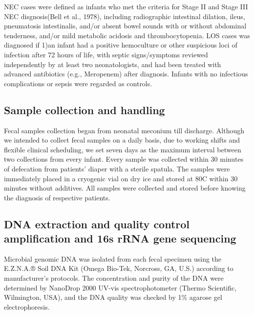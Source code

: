 \documentclass[fleqn,10pt,lineno]{wlpeerj} %
\begin{document}
  NEC cases were defined as infants who met the criteria for Stage II and Stage III NEC disgnosis(Bell et al., 1978), including radiographic intestinal dilation, ileus, pneumatosis intestinalis, and/or absent bowel sounds with or without abdominal tenderness, and/or mild metabolic acidosis and thrombocytopenia. LOS cases was diagnosed if 1)an infant had a positive hemoculture or other suspicious loci of infection after 72 hours of life, with septic signs/symptoms reviewed independently by at least two neonatologists, and had been treated with advanced antibiotics (e.g., Meropenem) after diagnosis. Infants with no infectious complications or sepsis were regarded as controls.

  \subsection*{Sample collection and handling}
  Fecal samples collection began from neonatal meconium till discharge.   Although we intended to collect fecal samples on a daily basis, due to working shifts and flexible clinical scheduling, we set seven days as the maximum interval between two collections from every infant. Every sample was collected within 30 minutes of defecation from patients' diaper with a sterile spatula. The samples were immediately placed in a cryogenic vial on dry ice and stored at 80\textdegree{}C within 30 minutes without additives. All samples were collected and stored before knowing the diagnosis of respective patients.

  \subsection*{DNA extraction and quality control amplification and 16s rRNA gene sequencing}
  Microbial genomic DNA was isolated from each fecal specimen using the E.Z.N.A.® Soil DNA Kit (Omega Bio-Tek, Norcross, GA, U.S.) according to manufacturer’s protocols. The concentration and purity of the DNA were determined by NanoDrop 2000 UV-vis spectrophotometer (Thermo Scientific, Wilmington, USA), and the DNA quality was checked by 1\% agarose gel electrophoresis.
\end{document}
